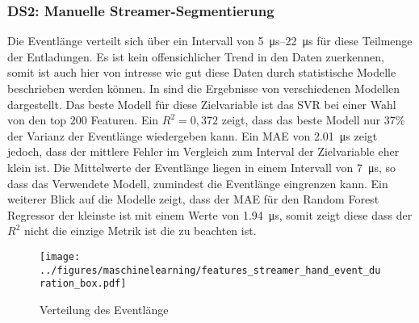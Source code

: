 \subsubsection{DS2: Manuelle Streamer-Segmentierung}

Die Eventlänge verteilt sich über ein Intervall von \SIrange{5}{22}{\micro\second} für diese Teilmenge der Entladungen. Es ist kein offensichlicher Trend in den Daten zuerkennen, somit ist auch hier von intresse wie gut diese Daten durch statistische Modelle beschrieben werden können. In  sind die Ergebnisse von verschiedenen Modellen dargestellt. Das beste Modell für diese Zielvariable ist das SVR bei einer Wahl von den top \(200\) Featuren. Ein \(R^2 = 0,372\) zeigt, dass das beste Modell nur 37\% der Varianz der Eventlänge wiedergeben kann. Ein MAE von \SI{2,01}{\micro\second} zeigt jedoch, dass der mittlere Fehler im Vergleich zum Interval der Zielvariable eher klein ist. Die Mittelwerte der Eventlänge liegen in einem Intervall von \SI{7}{\micro\second}, so dass das Verwendete Modell, zumindest die Eventlänge eingrenzen kann. Ein weiterer Blick auf die Modelle zeigt, dass der MAE für den Random Forest Regressor der kleinste ist mit einem Werte von \SI{1,94}{\micro\second}, somit zeigt diese dass der \(R^2\) nicht die einzige Metrik ist die zu beachten ist.

\begin{figure}[H]
    \centering
      \texttt{[image: ../figures/maschinelearning/features\_streamer\_hand\_event\_duration\_box.pdf]}
      \caption{Verteilung des Eventlänge}
      \label{fig:streamer_hand_event_duration_box}
\end{figure}



